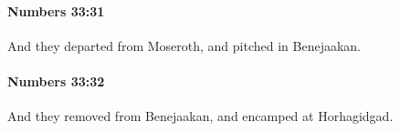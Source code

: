 		\paragraph{Numbers 33:31} %
			\label{NUMBERS-33-31}

			And they departed from Moseroth, and pitched in Benejaakan.


		\paragraph{Numbers 33:32} %
			\label{NUMBERS-33-32}

			And they removed from Benejaakan, and encamped at Horhagidgad.


